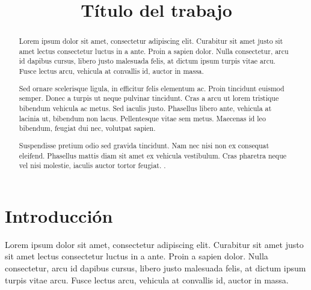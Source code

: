 \documentclass[conference]{IEEEtran}
\begin{document}
\title{Título del trabajo}

\author{
}

\maketitle

\begin{abstract}
Lorem ipsum dolor sit amet, consectetur adipiscing elit. Curabitur sit amet justo sit amet lectus consectetur luctus in a ante. Proin a sapien dolor. Nulla consectetur, arcu id dapibus cursus, libero justo malesuada felis, at dictum ipsum turpis vitae arcu. Fusce lectus arcu, vehicula at convallis id, auctor in massa.

Sed ornare scelerisque ligula, in efficitur felis elementum ac. Proin tincidunt euismod semper. Donec a turpis ut neque pulvinar tincidunt. Cras a arcu ut lorem tristique bibendum vehicula ac metus. Sed iaculis justo. Phasellus libero ante, vehicula at lacinia ut, bibendum non lacus. Pellentesque vitae sem metus. Maecenas id leo bibendum, feugiat dui nec, volutpat sapien.
 
Suspendisse pretium odio sed gravida tincidunt. Nam nec nisi non ex consequat eleifend. Phasellus mattis diam sit amet ex vehicula vestibulum. Cras pharetra neque vel nisi molestie, iaculis auctor tortor feugiat.
.
\end{abstract}


\section{Introducción}
\label{sec:intro}
Lorem ipsum dolor sit amet, consectetur adipiscing elit. Curabitur sit amet justo sit amet lectus consectetur luctus in a ante. Proin a sapien dolor. Nulla consectetur, arcu id dapibus cursus, libero justo malesuada felis, at dictum ipsum turpis vitae arcu. Fusce lectus arcu, vehicula at convallis id, auctor in massa.
\end{document}
